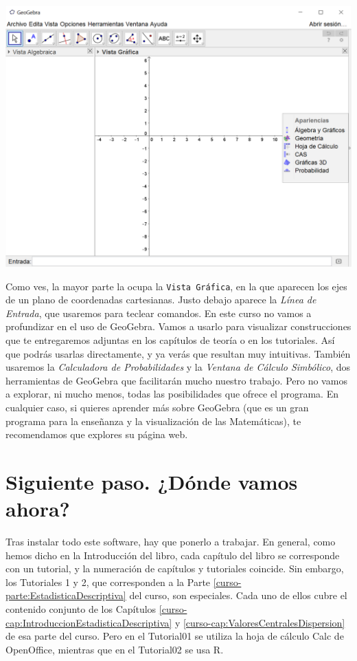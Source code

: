 \documentclass[10pt,a4paper]{article}
\newcounter {cont01}
\begin{document}
    \begin{center}
    \includegraphics[width=15cm]{../fig/Tut00-GeoGebraSetup06-201605.png}
    \end{center}
Como ves, la mayor parte la ocupa la {\tt Vista Gráfica}, en la que aparecen los ejes de un plano
de coordenadas cartesianas.  Justo debajo aparece la {\em Línea de Entrada}, que usaremos para teclear comandos. En este curso no vamos a profundizar en el uso de GeoGebra. Vamos a usarlo para visualizar construcciones que te entregaremos adjuntas en los capítulos de
teoría o en los tutoriales. Así que podrás usarlas directamente, y ya verás que resultan muy
intuitivas. También usaremos la {\em Calculadora de Probabilidades} y la {\em Ventana de Cálculo Simbólico}, dos herramientas de GeoGebra que facilitarán mucho nuestro trabajo. Pero no vamos a explorar, ni mucho menos, todas las posibilidades que ofrece el programa. En cualquier caso, si quieres aprender más sobre GeoGebra (que es un gran programa para la enseñanza y la visualización de las Matemáticas), te recomendamos que explores su página web.
\section{Siguiente paso. ¿Dónde vamos ahora?}

Tras instalar todo este software, hay que ponerlo a trabajar. En general, como hemos dicho en la Introducción del libro, cada capítulo del libro se corresponde con un tutorial, y la numeración de capítulos y tutoriales coincide. Sin embargo, los Tutoriales 1 y 2, que corresponden a la Parte \ref{curso-parte:EstadisticaDescriptiva} del curso, son especiales. Cada uno de ellos cubre el contenido conjunto de los Capítulos \ref{curso-cap:IntroduccionEstadisticaDescriptiva} y \ref{curso-cap:ValoresCentralesDispersion} de esa parte del curso. Pero en el Tutorial01 se utiliza la hoja de cálculo Calc de OpenOffice, mientras que en el Tutorial02 se usa R.
\end{document}
